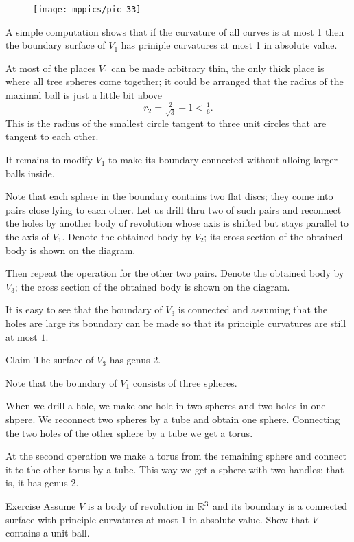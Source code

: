 \begin{figure}[h!]%
\centering
\texttt{[image: mppics/pic-33]}
\vskip0mm
\end{figure}

A simple computation shows that if the curvature of all curves is at most 1 then the boundary surface of $V_1$ has priniple curvatures at most 1 in absolute value.

At most of the places $V_1$ can be made arbitrary thin,
the only thick place is where all tree spheres come together;
it could be arranged that the radius of the maximal ball is  just a little bit above 
\[r_2=\tfrac2{\sqrt{3}}-1< \tfrac16.\]
This is the radius of the smallest circle tangent to three unit circles that are tangent to each other.


It remains to modify $V_1$ to make its boundary connected without  alloing larger balls inside.

Note that each sphere in the boundary contains two flat discs;
they come into pairs close lying to each other. 
Let us drill thru two of such pairs and reconnect the holes by another body of revolution whose 
axis is shifted but stays parallel to the axis of $V_1$.
Denote the obtained body by $V_2$; its cross section of the obtained body is shown on the diagram. 

Then repeat the operation for the other two pairs.
Denote the obtained body by $V_3$; the cross section of the obtained body is shown on the diagram.

It is easy to see that the boundary of $V_3$ is connected
and assuming that the holes are large its boundary can be made so that its principle curvatures are still at most $1$.
\qeds

\begin{thm}{Claim}
The surface of $V_3$ has genus 2.
\end{thm}


Note that the boundary of $V_1$ consists of three spheres.

When we drill a hole, we make one hole in two spheres and two holes in one shpere.
We reconnect two spheres by a tube and obtain one sphere.
Connecting the two holes of the other sphere by a tube we get a torus.

At the second operation we make a torus from the remaining sphere and connect it to the other torus by a tube.
This way we get a sphere with two handles; that is, it has genus 2.
\qeds

\begin{thm}{Exercise}
Assume $V$ is a body of revolution in $\mathbb{R}^3$ and its boundary is a connected surface with principle curvatures at most 1 in absolute value.
Show that $V$ contains a unit ball.
\end{thm}

